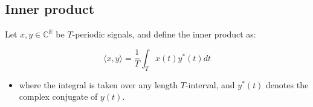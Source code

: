 \subsection{Inner product}
\begin{definition}
    Let \( x, y \in \mathbb{C}^{\mathbb{R}} \) be \( T \)-periodic signals, and define the inner product as:
    
    \[
    \langle x, y \rangle = \frac{1}{T} \int_T x(t) y^*(t) dt
    \]
    \begin{itemize}
        \item where the integral is taken over any length \( T \)-interval, and \( y^*(t) \) denotes the complex conjugate of \( y(t) \).
    \end{itemize}
\end{definition}